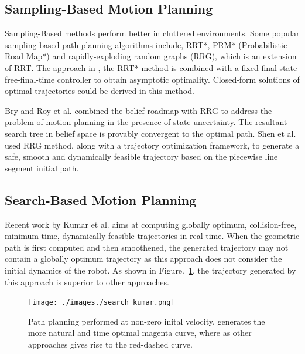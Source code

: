 \subsection{Sampling-Based Motion Planning}
\label{sec:sampling_planning}
Sampling-Based methods perform better in cluttered environments. Some popular sampling based path-planning algorithms include, RRT*, PRM* (Probabilistic Road Map*) and rapidly-exploding random graphs (RRG), which is an extension of RRT. The approach in \cite{webb2013kinodynamic}, the RRT* method is combined with a fixed-final-state-free-final-time controller to obtain asymptotic optimality. Closed-form solutions of optimal trajectories could be derived in this method. 

Bry and Roy et al. \cite{bry2011rapidly} combined the belief roadmap with RRG to address the problem of motion planning in the presence of state uncertainty. The resultant search tree in belief space is provably convergent to the optimal path. Shen et al. \cite{shen2017gradient} used RRG method, along with a trajectory optimization framework, to generate a safe, smooth and dynamically feasible trajectory based on the piecewise line segment initial path. 

\subsection{Search-Based Motion Planning}
\label{sec:search_based_planning}
Recent work by Kumar et al. \cite{kumar2017search} aims at computing globally optimum, collision-free, minimum-time, dynamically-feasible trajectories in real-time. When the geometric path is first computed and then smoothened, the generated trajectory may not contain a globally optimum trajectory as this approach does not consider the initial dynamics of the robot. As shown in Figure.~\ref{fig:search_kumar}, the trajectory generated by this approach is superior to other approaches. 

\begin{figure}
\centering
\texttt{[image: ./images./search\_kumar.png]}
\caption{Path planning performed at non-zero inital velocity. \cite{kumar2017search} generates the more natural and time optimal magenta curve, where as other approaches gives rise to the red-dashed curve.}
\label{fig:search_kumar}
\end{figure}

